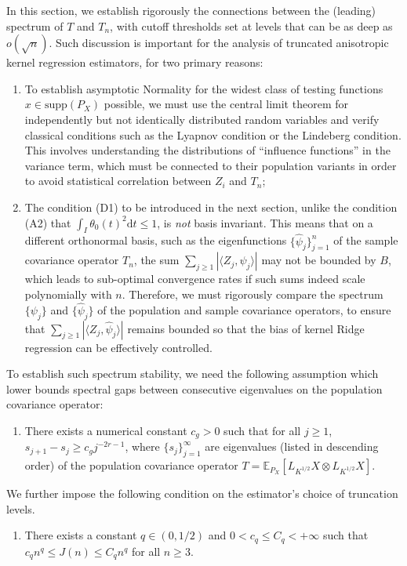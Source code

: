 \documentclass[11pt,a4paper]{article}
\renewcommand{\hat}{\widehat}
\theoremstyle{definition}
\theoremstyle{plain}
\theoremstyle{remark}
\newcommand{\supp}{\mathrm{supp}}
\newcommand{\ud}{\mathrm d}
\begin{document}
In this section, we establish rigorously the connections between the (leading) spectrum of $T$ and $T_n$,
with cutoff thresholds set at levels that can be as deep as $o(\sqrt{n})$. Such discussion is important for the analysis of truncated anisotropic kernel regression estimators, for two primary reasons:
\begin{enumerate}
\item To establish asymptotic Normality for the widest class of testing functions $x\in\supp(P_X)$ possible, we must use the central limit theorem for independently but not identically distributed random variables
and verify classical conditions such as the Lyapnov condition or the Lindeberg condition. This involves understanding the distributions of ``influence functions'' in the variance term, which must be connected to
their population variants in order to avoid statistical correlation between $Z_i$ and $T_n$;
\item The condition (D1) to be introduced in the next section, unlike the condition (A2) that $\int_I \theta_0(t)^2\ud t\leq 1$, is \emph{not} basis invariant. This means that on a different orthonormal basis,
such as the eigenfunctions $\{\hat\psi_j\}_{j=1}^n$ of the sample covariance operator $T_n$, the sum $\sum_{j\geq 1}|\langle Z_j,\hat\psi_j\rangle|$ may not be bounded by $B$,
which leads to sub-optimal convergence rates if such sums indeed scale polynomially with $n$.
Therefore, we must rigorously compare the spectrum $\{\psi_j\}$ and $\{\hat\psi_j\}$ of the population and sample covariance operators,
to ensure that $\sum_{j\geq 1}|\langle Z_j,\hat\psi_j\rangle|$ remains bounded so that the bias of kernel Ridge regression can be effectively controlled.
\end{enumerate}

To establish such spectrum stability, we need the following assumption which lower bounds spectral gaps between consecutive eigenvalues on the population covariance operator:
\begin{enumerate}
\item[(C1)] There exists a numerical constant $c_g>0$ such that for all $j\geq 1$, $s_{j+1}-s_j\geq c_g j^{-2r-1}$, where $\{s_j\}_{j=1}^{\infty}$ are eigenvalues (listed in descending order) of the population covariance operator $T=\mathbb E_{P_X}[L_{K^{1/2}}X\otimes L_{K^{1/2}}X]$.
\end{enumerate}

We further impose the following condition on the estimator's choice of truncation levels.
\begin{enumerate}
\item[(C2)] There exists a constant $q\in(0,1/2)$ and $0<c_q\leq C_q<+\infty$ such that $c_q n^q\leq J(n)\leq C_q n^q$ for all $n\geq 3$.
\end{enumerate}
\end{document}
